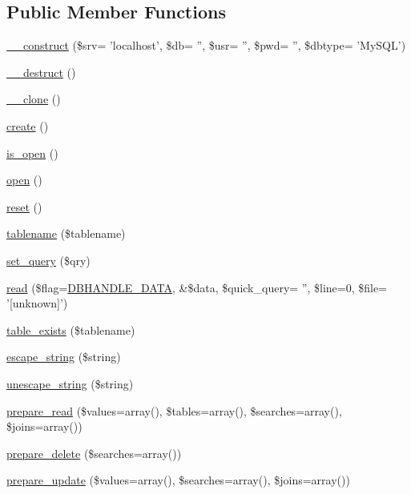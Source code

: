 \subsection*{Public Member Functions}
\begin{DoxyCompactItemize}
\item 
\hyperlink{classDbHandler_ae54e9d4643f41a9296167086f6a769fc}{\_\-\_\-construct} (\$srv= 'localhost', \$db= '', \$usr= '', \$pwd= '', \$dbtype= 'MySQL')
\item 
\hyperlink{classDbHandler_a7cd6bd727d1f296eb5dbfae6ca36ab3f}{\_\-\_\-destruct} ()
\item 
\hyperlink{classDbHandler_ada20e62b915bc87a1de28389a2ee81e1}{\_\-\_\-clone} ()
\item 
\hyperlink{classDbHandler_ac9e93cb0ab57f03b2719eebd0c0ee2ef}{create} ()
\item 
\hyperlink{classDbHandler_aa342b2bd73c5f8ce05cadcba02f9cf5a}{is\_\-open} ()
\item 
\hyperlink{classDbHandler_afccbfc69ead84f8445116e050d1cfc2d}{open} ()
\item 
\hyperlink{classDbHandler_a9982df4830f05803935bb31bac7fae3d}{reset} ()
\item 
\hyperlink{classDbHandler_abaca15a312800e5522b3efd9dff036f5}{tablename} (\$tablename)
\item 
\hyperlink{classDbHandler_a305a3225c4760a88a06b0d55d0893962}{set\_\-query} (\$qry)
\item 
\hyperlink{classDbHandler_a5ebfdc2acfcb0e9cbc2861fc55c7127c}{read} (\$flag=\hyperlink{class_8dbhandler_8php_acc5178c2a582eafa4ef488ed3394b725}{DBHANDLE\_\-DATA}, \&\$data, \$quick\_\-query= '', \$line=0, \$file= '\mbox{[}unknown\mbox{]}')
\item 
\hyperlink{classDbHandler_a11e750a2c46022241eba49df81607ba9}{table\_\-exists} (\$tablename)
\item 
\hyperlink{classDbHandler_a67d77702ff6db70f89123d3f947af143}{escape\_\-string} (\$string)
\item 
\hyperlink{classDbHandler_a27c604b14c39913d34630e5504979b15}{unescape\_\-string} (\$string)
\item 
\hyperlink{classDbHandler_a3f9a0832d2de73e1f698b6d3c33569e6}{prepare\_\-read} (\$values=array(), \$tables=array(), \$searches=array(), \$joins=array())
\item 
\hyperlink{classDbHandler_a973e07b361c889b6ff44e93cc7665ca4}{prepare\_\-delete} (\$searches=array())
\item 
\hyperlink{classDbHandler_a9bddaca38be2544f6fdd4d82b3cd1c50}{prepare\_\-update} (\$values=array(), \$searches=array(), \$joins=array())

\end{DoxyCompactItemize}
